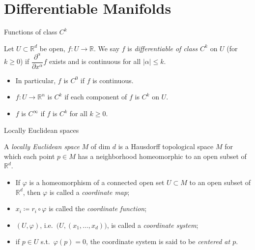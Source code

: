 \documentclass[10pt]{beamer}
\newcommand{\R}{\mathbb{R}}
\begin{document}
\section{Differentiable Manifolds}

\begin{frame}{Functions of class $C^k$}
	\begin{definition}[$C^k$ functions]
		Let $U \subset \R^d$ be open, $f: U \to \R$. We say $f$ is
		\emph{differentiable of class $C^k$} on $U$ (for $k \geq 0$) if
		$\dfrac{\partial^\alpha}{\partial x^\alpha} f$ exists and is continuous
		for all $|\alpha| \leq k$.
		\begin{itemize}
			\item In particular, $f$ is $C^0$ if $f$ is continuous.
			\item $f: U \to \R^n$ is $C^k$ if each component of $f$ is $C^k$ on $U$.
			\item $f$ is $C^\infty$ if $f$ is $C^k$ for all $k \geq 0$.
		\end{itemize}
	\end{definition}
\end{frame}

\begin{frame}{Locally Euclidean spaces}
	\begin{definition}
		A \emph{locally Euclidean space} $M$ of dim $d$ is a Hausdorff
		topological space $M$ for which each point $p \in M$ has a neighborhood
		homeomorphic to an open subset of $\R^d$.
		\begin{itemize}
			\item If $\varphi$ is a homeomorphism of a connected open set
			      $U \subset M$ to an open subset of $\R^d$, then $\varphi$ is
			      called a \emph{coordinate map};
			\item $x_i \coloneqq r_i \circ \varphi$ is called the
			      \emph{coordinate function};
			\item $(U, \varphi)$, i.e.\ $\bigl(U, (x_1, \dots, x_d)\bigr)$, is
			      called a \emph{coordinate system};
			\item if $p \in U$ s.t.\ $\varphi(p) = 0$, the coordinate system is
			      said to be \emph{centered at $p$}.
		\end{itemize}
	\end{definition}
\end{frame}
\end{document}
